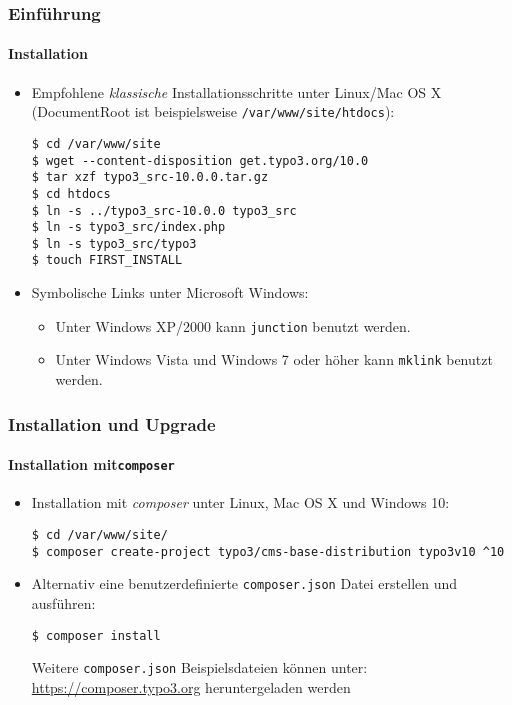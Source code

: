 
\begin{frame}[fragile]
	\frametitle{Einführung}
	\framesubtitle{Installation}

	\begin{itemize}
		\item Empfohlene \textit{klassische} Installationsschritte unter Linux/Mac OS X\newline
			(DocumentRoot ist beispielsweise \texttt{/var/www/site/htdocs}):
		\begin{lstlisting}
$ cd /var/www/site
$ wget --content-disposition get.typo3.org/10.0
$ tar xzf typo3_src-10.0.0.tar.gz
$ cd htdocs
$ ln -s ../typo3_src-10.0.0 typo3_src
$ ln -s typo3_src/index.php
$ ln -s typo3_src/typo3
$ touch FIRST_INSTALL
		\end{lstlisting}

		\item Symbolische Links unter Microsoft Windows:

			\begin{itemize}
				\item Unter Windows XP/2000 kann \texttt{junction} benutzt werden.
				\item Unter Windows Vista und Windows 7 oder höher kann \texttt{mklink} benutzt werden.
			\end{itemize}

	\end{itemize}
\end{frame}


\begin{frame}[fragile]
	\frametitle{Installation und Upgrade}
	\framesubtitle{Installation mit\texttt{composer}}

	\begin{itemize}
		\item Installation mit \textit{composer} unter Linux, Mac OS X und Windows 10:

			\begin{lstlisting}
$ cd /var/www/site/
$ composer create-project typo3/cms-base-distribution typo3v10 ^10
			\end{lstlisting}

		\item Alternativ eine benutzerdefinierte \texttt{composer.json} Datei erstellen und ausführen:

			\begin{lstlisting}
$ composer install
			\end{lstlisting}

			Weitere \texttt{composer.json} Beispielsdateien können unter:\newline
				\href{https://composer.typo3.org}{https://composer.typo3.org} heruntergeladen werden

	\end{itemize}
\end{frame}

